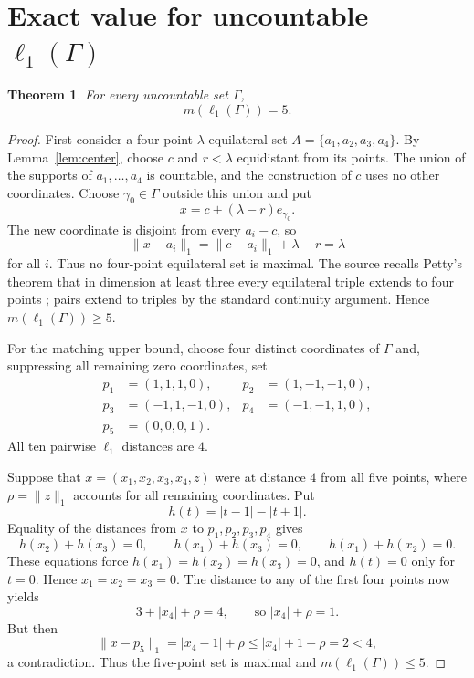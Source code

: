 \documentclass[11pt]{article}
\newtheorem{theorem}{Theorem}
\newcommand{\ellone}{\ell_1}
\begin{document}
\section{Exact value for uncountable \texorpdfstring{$\ell_1(\Gamma)$}{ell1(Gamma)}}

\begin{theorem}\label{thm:main}
For every uncountable set $\Gamma$,
\[
 \boxed{m(\ellone(\Gamma))=5.}
\]
\end{theorem}

\begin{proof}
First consider a four-point $\lambda$-equilateral set $A=\{a_1,a_2,a_3,a_4\}$. By Lemma~\ref{lem:center}, choose $c$ and $r<\lambda$ equidistant from its points. The union of the supports of $a_1,\ldots,a_4$ is countable, and the construction of $c$ uses no other coordinates. Choose $\gamma_0\in\Gamma$ outside this union and put
\[
 x=c+(\lambda-r)e_{\gamma_0}.
\]
The new coordinate is disjoint from every $a_i-c$, so
\[
 \|x-a_i\|_1=\|c-a_i\|_1+\lambda-r=\lambda
\]
for all $i$. Thus no four-point equilateral set is maximal. The source recalls Petty's theorem that in dimension at least three every equilateral triple extends to four points \cite{SV}; pairs extend to triples by the standard continuity argument. Hence $m(\ellone(\Gamma))\geq5$.

For the matching upper bound, choose four distinct coordinates of $\Gamma$ and, suppressing all remaining zero coordinates, set
\begin{align*}
 p_1&=(1,1,1,0),&p_2&=(1,-1,-1,0),\\
 p_3&=(-1,1,-1,0),&p_4&=(-1,-1,1,0),\\
 p_5&=(0,0,0,1).
\end{align*}
All ten pairwise $\ell_1$ distances are $4$.

Suppose that $x=(x_1,x_2,x_3,x_4,z)$ were at distance $4$ from all five points, where $\rho=\|z\|_1$ accounts for all remaining coordinates. Put
\[
 h(t)=|t-1|-|t+1|.
\]
Equality of the distances from $x$ to $p_1,p_2,p_3,p_4$ gives
\[
 h(x_2)+h(x_3)=0,\qquad
 h(x_1)+h(x_3)=0,\qquad
 h(x_1)+h(x_2)=0.
\]
These equations force $h(x_1)=h(x_2)=h(x_3)=0$, and $h(t)=0$ only for $t=0$. Hence $x_1=x_2=x_3=0$. The distance to any of the first four points now yields
\[
 3+|x_4|+\rho=4,\qquad\text{so }|x_4|+\rho=1.
\]
But then
\[
 \|x-p_5\|_1=|x_4-1|+\rho
 \leq |x_4|+1+\rho=2<4,
\]
a contradiction. Thus the five-point set is maximal and $m(\ellone(\Gamma))\leq5$.
\end{proof}
\end{document}
